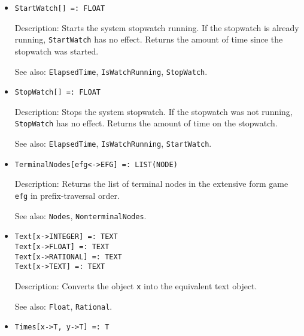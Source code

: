 \begin{itemize}
\item
\protect \large \begin{verbatim}
StartWatch[] =: FLOAT
\end{verbatim}\normalsize

\bd
\item
[Description:] Starts the system stopwatch running.  If the stopwatch
is already running, {\tt StartWatch} has no effect.  Returns the amount
of time since the stopwatch was started.
\item
[See also:] {\tt ElapsedTime}, {\tt IsWatchRunning}, {\tt StopWatch}.
\ed

\item
\protect \large \begin{verbatim}
StopWatch[] =: FLOAT
\end{verbatim}\normalsize

\bd
\item
[Description:] Stops the system stopwatch.  If the stopwatch was not
running, {\tt StopWatch} has no effect.  Returns the amount of time
on the stopwatch.
\item
[See also:] {\tt ElapsedTime}, {\tt IsWatchRunning}, {\tt StartWatch}.
\ed


\item
\protect \large \begin{verbatim} 
TerminalNodes[efg<->EFG] =: LIST(NODE)
\end{verbatim}\normalsize

\bd
\item
[Description:] Returns the list of terminal nodes in the extensive form
game \verb+efg+ in prefix-traversal order.
\item
[See also:] {\tt Nodes}, {\tt NonterminalNodes}.
\ed

\item
\protect \large \begin{verbatim}
Text[x->INTEGER] =: TEXT
Text[x->FLOAT] =: TEXT
Text[x->RATIONAL] =: TEXT
Text[x->TEXT] =: TEXT
\end{verbatim} \normalsize

\bd
\item
[Description:] Converts the object \verb+x+ into the equivalent text object.
\item
[See also:] {\tt Float}, {\tt Rational}.
\ed

\item 
\protect \large \begin{verbatim}
Times[x->T, y->T] =: T
\end{verbatim} \normalsize
  

\end{itemize}
